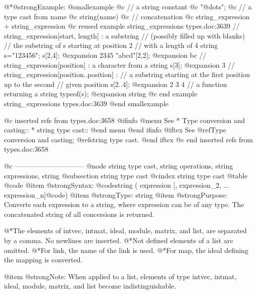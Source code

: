 {{{{{{@*@strong{Example:}
@smallexample
@c  // a string constant
@c  "@dots{}";
@c  // a type cast from name
@c  string(name)
@c  // concatenation
@c  string_expression + string_expression
@c reused example string_expressions types.doc:3639 
// string_expression[start, length] : a substring
// (possibly filled up with blanks)
// the substring of s starting at position 2
// with a length of 4
string s="123456";
s[2,4];
@expansion{} 2345
"abcd"[2,2];
@expansion{} bc
// string_expression[position] : a character from a string
s[3];
@expansion{} 3
// string_expression[position..position] :
// a substring starting at the first position up to the second
// given position
s[2..4];
@expansion{} 2 3 4
// a function returning a string
typeof(s);
@expansion{} string
@c end example string_expressions types.doc:3639
@end smallexample

@c inserted refs from types.doc:3658
@ifinfo
@menu
See 
* Type conversion and casting::
* string type cast::
@end menu
@end ifinfo
@iftex
See 
@ref{Type conversion and casting};
@ref{string type cast}.
@end iftex
@c end inserted refs from types.doc:3658

@c ------------------------------
@node string type cast,  string operations, string expressions, string
@subsection string type cast
@cindex string type cast
@table @code
@item @strong{Syntax:}
@code{string (} expression [, expression_2, ... expression_n]@code{)}
@item @strong{Type:}
string
@item @strong{Purpose:}
Converts each expression to a string, where expression can be of any
type. The concatenated string of all concersions is returned.

@*The elements of intvec, intmat, ideal, module, matrix, and list, are
separated by a comma. No newlines are inserted.
@*Not defined elements of a list are omitted.
@*For link, the name of the link is used.
@*For map, the ideal defining the mapping is converted.

@item @strong{Note:}
When applied to a list, elements of type intvec, intmat, ideal, module,
matrix, and list become indistinguishable.

}}}}}}
